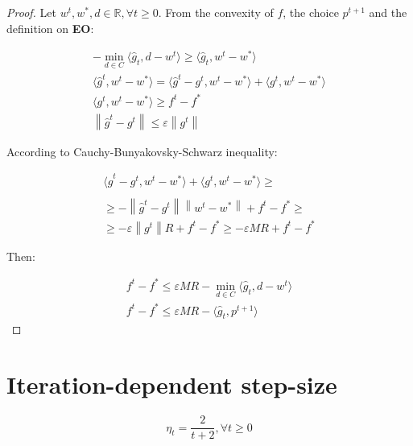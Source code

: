 \documentclass[runningheads, draft]{llncs}
\newcommand{\norm}[1]{\left\lVert#1\right\rVert}
\newcommand{\vprod}[1]{\langle#1\rangle}
\newcommand{\errgrad}{\hat{g}}
\begin{document}
\begin{proof}
    Let $w^t, w^*, d \in \mathbb{R}, \forall t \geqslant 0$. From the convexity
    of $f$, the choice $p^{t+1}$ and the definition on \textbf{EO}:

    \begin{equation}
        \begin{split}
            -\min_{d \in C}\vprod{\errgrad_t, d - w^t} \geqslant
            \vprod{\errgrad_t, w^t - w^*}              \\
            \vprod{\errgrad^t, w^t - w^*} = \vprod{\errgrad^t - g^t, w^t - w^*} +
            \vprod{g^t, w^t - w^*}                     \\
            \vprod{g^t, w^t - w^*} \geqslant f^t - f^* \\
            \norm{\errgrad^t - g^t} \leqslant \varepsilon \norm{g^t}
        \end{split}
    \end{equation}

    According to Cauchy-Bunyakovsky-Schwarz inequality:

    \begin{equation}
        \begin{split}
            \vprod{\errgrad^t - g^t, w^t - w^*} +
            \vprod{g^t, w^t - w^*}\geqslant \\
            \\\geqslant- \norm{\errgrad^t - g^t} \norm{w^t - w^*}
            + f^t - f^* \geqslant           \\
            \geqslant - \varepsilon \norm{g^t} R
            + f^t - f^* \geqslant - \varepsilon M R + f^t - f^*
        \end{split}
    \end{equation}

    Then:

    \begin{equation}
        \begin{split}
            f^t - f^* \leqslant \varepsilon M R -
            \min\limits_{d \in C}\vprod{\errgrad_t, d - w^t} \\
            f^t - f^* \leqslant \varepsilon M R - \vprod{\errgrad_t, p^{t + 1}}
        \end{split}
    \end{equation}
\end{proof}
%
\section{Iteration-dependent step-size}
%
\begin{equation}\label{eq:iteration-dependent-step-size}
    \eta_t = \frac{2}{t + 2}, \forall t \geqslant 0
\end{equation}
%
\end{document}
